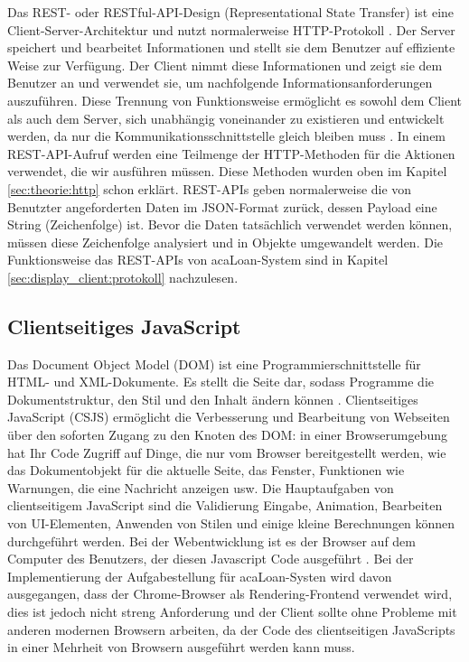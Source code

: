 Das REST- oder RESTful-API-Design (Representational State Transfer) ist eine Client-Server-Architektur und nutzt normalerweise HTTP-Protokoll \cite{website:rest}. Der Server speichert und bearbeitet Informationen und stellt sie dem Benutzer auf effiziente Weise zur Verfügung. Der Client nimmt diese Informationen und zeigt sie dem Benutzer an und verwendet sie, um nachfolgende Informationsanforderungen auszuführen. Diese Trennung von Funktionsweise ermöglicht es sowohl dem Client als auch dem Server, sich unabhängig voneinander zu existieren und entwickelt werden, da nur die Kommunikationsschnittstelle gleich bleiben muss  \cite{website:rest2}. In einem REST-API-Aufruf werden eine Teilmenge der HTTP-Methoden für die Aktionen verwendet, die wir ausführen müssen. Diese Methoden wurden oben im Kapitel \ref{sec:theorie:http} schon erklärt. REST-APIs geben normalerweise die von Benutzter angeforderten Daten im JSON-Format zurück, dessen Payload eine String (Zeichenfolge) ist. Bevor die Daten tatsächlich verwendet werden können, müssen diese Zeichenfolge analysiert und in Objekte umgewandelt werden. Die Funktionsweise das REST-APIs von acaLoan-System sind in Kapitel \ref{sec:display_client:protokoll} nachzulesen.

\subsection{Clientseitiges JavaScript}
\label{sec:theorie:js}
Das Document Object Model (DOM) ist eine Programmierschnittstelle für HTML- und XML-Dokumente. Es stellt die Seite dar, sodass Programme die Dokumentstruktur, den Stil und den Inhalt ändern können \cite{website:dom}. Clientseitiges JavaScript (CSJS) ermöglicht die Verbesserung und Bearbeitung von Webseiten über den soforten Zugang zu den Knoten des DOM: in einer Browserumgebung hat Ihr Code Zugriff auf Dinge, die nur vom Browser bereitgestellt werden, wie das Dokumentobjekt für die aktuelle Seite, das Fenster, Funktionen wie Warnungen, die eine Nachricht anzeigen usw. Die Hauptaufgaben von clientseitigem JavaScript sind die Validierung Eingabe, Animation, Bearbeiten von UI-Elementen, Anwenden von Stilen und einige kleine Berechnungen können durchgeführt werden. Bei der Webentwicklung ist es der Browser auf dem Computer des Benutzers, der diesen Javascript Code ausgeführt \cite{website:csjs}. Bei der Implementierung der Aufgabestellung für acaLoan-Systen wird davon ausgegangen, dass der Chrome-Browser als Rendering-Frontend verwendet wird, dies ist jedoch nicht streng Anforderung und der Client sollte ohne Probleme mit anderen modernen Browsern arbeiten, da der Code des clientseitigen JavaScripts in einer Mehrheit von Browsern ausgeführt werden kann muss. 

